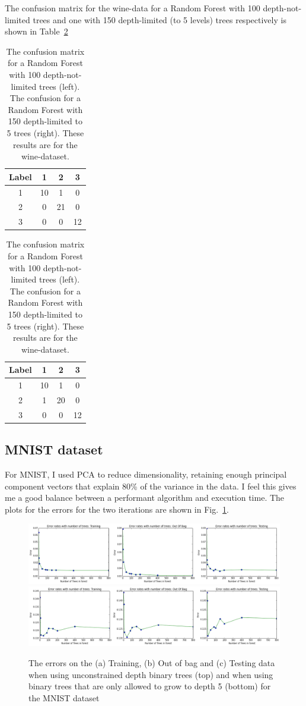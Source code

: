 \documentclass[5pt]{article}
\begin{document}
The confusion matrix for the wine-data for a Random Forest with 100 depth-not-limited 
trees and one with 150 depth-limited (to 5 levels) trees respectively is shown
in Table~\ref{tab:confusionWine}

\begin{table}
\centering
\begin{tabular}{cccc}
\toprule
Label & 1 & 2 & 3\\
\midrule
  1 & 10 & 1 & 0\\
  2 & 0 & 21 & 0\\
  3 & 0 & 0 & 12\\
\bottomrule
\end{tabular}
\quad
\begin{tabular}{cccc}
\toprule
Label & 1 & 2 & 3 \\
\midrule
  1 & 10 & 1 & 0 \\
  2 & 1 & 20 & 0 \\
  3 & 0 & 0 & 12 \\
\bottomrule
\end{tabular}
\caption{The confusion matrix for a Random Forest with 100 depth-not-limited
  trees (left). The confusion for a Random Forest with 150 depth-limited to 5
trees (right). These results are for the wine-dataset.}
\label{tab:confusionWine}
\end{table}

\subsection{MNIST dataset}
For MNIST, I used PCA to reduce dimensionality, retaining enough principal
component vectors that explain 80\% of the variance in the data. I feel this
gives me a good balance between a performant algorithm and execution time.
The plots for the errors for the two iterations are shown in Fig.~\ref{fig:errorsMNIST}.

\begin{figure}
  \includegraphics[width=\textwidth]{images/baggingDepthInfiniteMNIST.png}
  \includegraphics[width=\textwidth]{images/baggingDepthLimitedMNIST.png}
\label{fig:errorsMNIST}
\caption{The errors on the (a) Training, (b) Out of bag and (c) Testing data when
  using unconstrained depth binary trees (top) and when using binary trees that
are only allowed to grow to depth 5 (bottom) for the MNIST dataset}
\end{figure}
\end{document}
